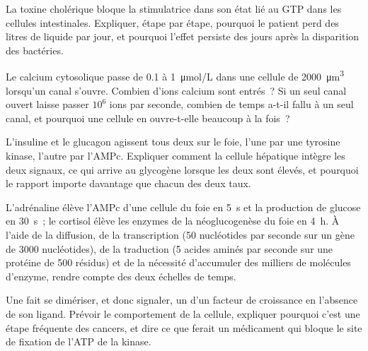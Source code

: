 \begin{exercise}[$\star\star$]\label{exo:b2:cell-signalling:7}
La toxine cholérique bloque la  stimulatrice dans son état lié
au GTP dans les cellules intestinales. Expliquer, étape par étape,
pourquoi le patient perd des litres de liquide par jour, et pourquoi
l'effet persiste des jours après la disparition des bactéries.
\end{exercise}

\begin{exercise}[$\star\star$]\label{exo:b2:cell-signalling:8}
Le calcium cytosolique passe de \qty{0.1}{} à \qty{1}{\micro mol/L} dans
une cellule de \qty{2000}{\micro m^3} lorsqu'un canal s'ouvre. Combien
d'ions calcium sont entrés~? Si un seul canal ouvert laisse passer
$10^{6}$ ions par seconde, combien de temps a-t-il fallu à un seul canal,
et pourquoi une cellule en ouvre-t-elle beaucoup à la fois~?
\end{exercise}

\begin{exercise}[$\star\star$]\label{exo:b2:cell-signalling:9}
L'insuline et le glucagon agissent tous deux sur le foie, l'une par une
tyrosine kinase, l'autre par l'AMPc. Expliquer comment la cellule
hépatique intègre les deux signaux, ce qui arrive au glycogène lorsque
les deux sont élevés, et pourquoi le rapport importe davantage que
chacun des deux taux.
\end{exercise}

\begin{exercise}[$\star\star\star$]\label{exo:b2:cell-signalling:10}
L'adrénaline élève l'AMPc d'une cellule du foie en \qty{5}{s} et la
production de glucose en \qty{30}{s}~; le cortisol élève les enzymes de
la néoglucogenèse du foie en \qty{4}{h}. À l'aide de la diffusion, de la
transcription (\qty{50}{} nucléotides par seconde sur un gène de
\qty{3000}{} nucléotides), de la traduction (\qty{5}{} acides aminés par
seconde sur une protéine de \num{500} résidus) et de la nécessité
d'accumuler des milliers de molécules d'enzyme, rendre compte des deux
échelles de temps.
\end{exercise}

\begin{exercise}[$\star\star\star$]\label{exo:b2:cell-signalling:11}
Une  fait se dimériser, et donc signaler, un  d'un facteur de croissance en l'absence de son
ligand. Prévoir le comportement de la cellule, expliquer pourquoi c'est
une étape fréquente des cancers, et dire ce que ferait un médicament qui
bloque le site de fixation de l'ATP de la kinase.
\end{exercise}

